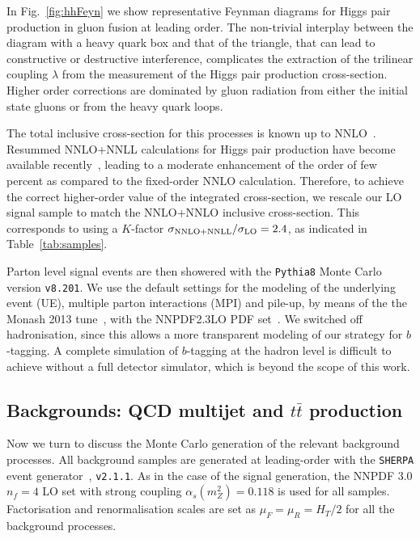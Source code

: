 In Fig.~\ref{fig:hhFeyn} we show representative Feynman diagrams
    for Higgs pair production in gluon fusion at
    leading order.
    The non-trivial interplay between the diagram with a heavy quark box
    and that of the triangle, that can lead to constructive or destructive interference,
    complicates the extraction of
    the trilinear coupling
    $\lambda$ from the measurement of the Higgs pair
    production cross-section.
    Higher order corrections are dominated by gluon radiation
    from either the initial state gluons or from the heavy quark loops.

    The total inclusive cross-section for this processes is
    known up to NNLO~\cite{deFlorian:2013jea}.
Resummed NNLO+NNLL calculations for Higgs pair production have become available recently~\cite{deFlorian:2015moa},
leading to a moderate enhancement of the order of
few percent as compared to the fixed-order NNLO calculation.
%
Therefore, to achieve the correct higher-order value of the  integrated cross-section, we rescale our LO signal sample to match the
NNLO+NNLO inclusive cross-section.
%
This corresponds to using a $K$-factor $\sigma_{\rm NNLO+NNLL}/\sigma_{\rm LO}=2.4$, as indicated
in Table~\ref{tab:samples}.

%
Parton level signal events are then showered with the {\tt Pythia8} Monte
Carlo~\cite{Sjostrand:2007gs,Sjostrand:2014zea} version {\tt v8.201}.
%
We use the default settings for the modeling
of the underlying event (UE), multiple parton
interactions (MPI) and pile-up, by means
of the the Monash 2013 tune~\cite{Skands:2014pea},
with the NNPDF2.3LO PDF set~\cite{Ball:2012cx}.
%
We switched off hadronisation, since this allows a more transparent
modeling of our strategy for
$b$-tagging.
%
A complete simulation of $b$-tagging at the hadron level is difficult
to achieve without a full
detector simulator, which is beyond the scope of this work.

\subsection{Backgrounds: QCD multijet and $t\bar{t}$ production}

Now we turn to discuss the Monte Carlo generation of the relevant background processes.
%
All background samples are generated at leading-order
with the {\tt SHERPA} event generator~\cite{Gleisberg:2008ta}, {\tt v2.1.1}.
%
As in the case of the signal generation,
the NNPDF 3.0 $n_f = 4$ LO set with strong coupling
$\alpha_s(m_Z^2)=0.118$ is used for all samples.
%
Factorisation and renormalisation scales are set as $\mu_F=\mu_R=H_T/2$ for all
the background processes.


